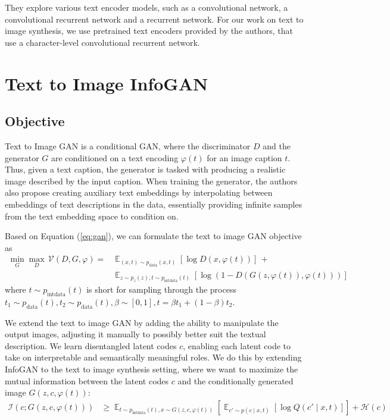 \documentclass{article}
\DeclareMathOperator*{\E}{\mathbb{E}}
\let\cite=\supercite
\begin{document}
They explore various text encoder models, such as a convolutional network, a convolutional recurrent network and a recurrent network. For our work on text to image synthesis, we use pretrained text encoders provided by the authors, that use a character-level convolutional recurrent network.


\section{Text to Image InfoGAN}

\subsection{Objective}

Text to Image GAN\cite{text2image} is a conditional GAN, where the discriminator $D$ and the generator $G$ are conditioned on a text encoding $\varphi(t)$ for an image caption $t$. Thus, given a text caption, the generator is tasked with producing a realistic image described by the input caption. When training the generator, the authors also propose creating auxiliary text embeddings by interpolating between embeddings of text descriptions in the data, essentially providing infinite samples from the text embedding space to condition on.

Based on Equation (\ref{eq:gan}), we can formulate the text to image GAN objective as
\begin{align}
\min_G \max_D\, \mathcal{V}(D,G, \varphi) =& \E_{(x,t) \sim p_{\text{data}}(x,t)}\left[\log D(x, \varphi(t))\right]\, + \nonumber\\
&\E_{z\sim p_z(z), t\sim p_{\text{intdata}}(t)}\left[\log(1-D(G(z, \varphi(t)), \varphi(t)))\right] \label{eq:t2i}
\end{align}
where $t \sim p_{\text{intdata}}(t)$ is short for sampling through the process $t_1 \sim p_{\text{data}}(t), t_2 \sim p_{\text{data}}(t), \beta \sim [0,1], t = \beta t_1 + (1-\beta) t_2$.

We extend the text to image GAN by adding the ability to manipulate the output images, adjusting it manually to possibly better suit the textual description. We learn disentangled latent codes $c$, enabling each latent code to take on interpretable and semantically meaningful roles. We do this by extending InfoGAN to the text to image synthesis setting, where we want to maximize the mutual information between the latent codes $c$ and the conditionally generated image $G(z,c,\varphi(t))$:
\begin{align}
\mathcal{I}(c;G(z,c,\varphi(t))) &\geq \E_{t\sim p_{\text{intdata}}(t), x\sim G(z,c,\varphi(t))}\left[\E_{c'\sim p(c\mid x,t)}\left[\log Q(c'\mid x,t)\right]\right] + \mathcal{H}(c)
\end{align}
\end{document}
